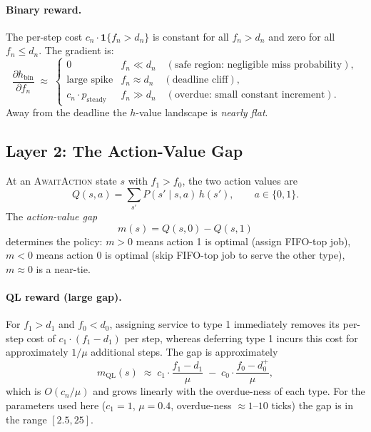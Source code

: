 \documentclass[11pt,a4paper]{article}
\begin{document}
\paragraph{Binary reward.}
The per-step cost $c_n \cdot \mathbf{1}\{f_n > d_n\}$ is constant for all
$f_n > d_n$ and zero for all $f_n \leq d_n$.  The gradient is:
\[
  \frac{\partial h_\text{bin}}{\partial f_n}
    \;\approx\;
  \begin{cases}
    0 & f_n \ll d_n
        \quad (\text{safe region: negligible miss probability}), \\
    \text{large spike} & f_n \approx d_n
        \quad (\text{deadline cliff}), \\
    c_n \cdot p_\text{steady} & f_n \gg d_n
        \quad (\text{overdue: small constant increment}).
  \end{cases}
\]
Away from the deadline the $h$-value landscape is \emph{nearly flat}.

\subsection{Layer 2: The Action-Value Gap}

At an \textsc{AwaitAction} state $s$ with $f_1 > f_0$, the two action values
are
\[
  Q(s, a) = \sum_{s'} P(s' \mid s, a)\, h(s'), \qquad a \in \{0,1\}.
\]
The \emph{action-value gap}
\[
  m(s) = Q(s, 0) - Q(s, 1)
\]
determines the policy: $m > 0$ means action 1 is optimal (assign FIFO-top
job), $m < 0$ means action 0 is optimal (skip FIFO-top job to serve the
other type), $m \approx 0$ is a near-tie.

\paragraph{QL reward (large gap).}
For $f_1 > d_1$ and $f_0 < d_0$, assigning service to type 1 immediately
removes its per-step cost of $c_1 \cdot (f_1 - d_1)$ per step, whereas
deferring type 1 incurs this cost for approximately $1/\mu$ additional steps.
The gap is approximately
\[
  m_\text{QL}(s)
    \;\approx\; c_1 \cdot \frac{f_1 - d_1}{\mu}
    \;-\; c_0 \cdot \frac{f_0 - d_0^+}{\mu},
\]
which is $O(c_n / \mu)$ and grows linearly with the overdue-ness of each type.
For the parameters used here ($c_1 = 1$, $\mu = 0.4$, overdue-ness $\approx
1$--$10$ ticks) the gap is in the range $[2.5, 25]$.
\end{document}
